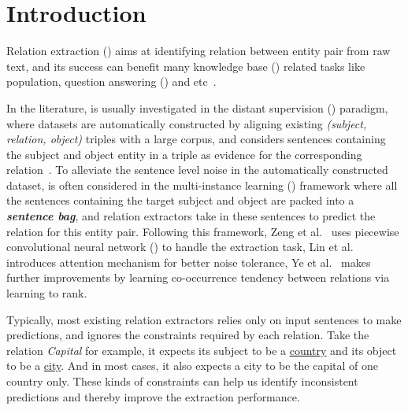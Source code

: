 \section{Introduction}

Relation extraction (\RE) aims at identifying relation between entity pair from raw text, and its success can benefit  many knowledge base (\KB) related tasks like \KB population, question answering (\QA) and etc~\cite{suchanek2013advances}.

In the literature, \RE is usually investigated in the distant supervision (\DS) paradigm, where datasets are automatically constructed by aligning existing \KB \emph{(subject, relation, object)} triples with a large corpus, and considers sentences containing the subject and object entity in a triple as evidence for the corresponding relation~\cite{mintz2009distant}.
To alleviate the sentence level noise in the automatically constructed dataset, \RE is often considered in the multi-instance learning (\MIL) framework where all the sentences containing the target subject and object are packed into a \textbf{\emph{sentence bag}}, and relation extractors take in these sentences to predict the relation for this entity pair. 
Following this framework, Zeng et al.~ uses piecewise convolutional neural network (\PCNN) to handle the extraction task, Lin et al.~ introduces attention mechanism for better noise tolerance,
Ye et al.~ makes further improvements by learning co-occurrence tendency between relations via learning to rank.

Typically, most existing relation extractors relies only on input sentences to make predictions, and ignores the constraints required by each relation.
Take the relation \emph{Capital} for example, it expects its subject to be a \underline{country} and its object to be a \underline{city}.
And in most cases, it also expects a city to be the capital of one country only.
These kinds of constraints can help us identify inconsistent predictions and thereby improve the extraction performance.

